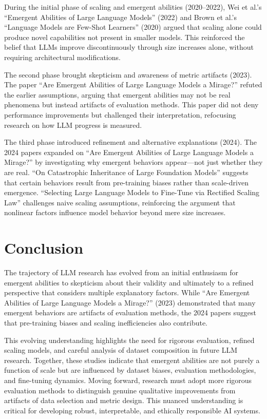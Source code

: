 \documentclass[10pt,a4paper]{article}
\begin{document}
During the initial phase of scaling and emergent abilities (2020–2022), Wei et al.'s ``Emergent Abilities of Large Language Models'' (2022) and Brown et al.'s ``Language Models are Few-Shot Learners'' (2020) argued that scaling alone could produce novel capabilities not present in smaller models. This reinforced the belief that LLMs improve discontinuously through size increases alone, without requiring architectural modifications.

The second phase brought skepticism and awareness of metric artifacts (2023). The paper ``Are Emergent Abilities of Large Language Models a Mirage?'' refuted the earlier assumptions, arguing that emergent abilities may not be real phenomena but instead artifacts of evaluation methods. This paper did not deny performance improvements but challenged their interpretation, refocusing research on how LLM progress is measured.

The third phase introduced refinement and alternative explanations (2024). The 2024 papers expanded on ``Are Emergent Abilities of Large Language Models a Mirage?'' by investigating why emergent behaviors appear—not just whether they are real. ``On Catastrophic Inheritance of Large Foundation Models'' suggests that certain behaviors result from pre-training biases rather than scale-driven emergence. ``Selecting Large Language Models to Fine-Tune via Rectified Scaling Law'' challenges naive scaling assumptions, reinforcing the argument that nonlinear factors influence model behavior beyond mere size increases.

\section{Conclusion}
The trajectory of LLM research has evolved from an initial enthusiasm for emergent abilities to skepticism about their validity and ultimately to a refined perspective that considers multiple explanatory factors. While ``Are Emergent Abilities of Large Language Models a Mirage?'' (2023) demonstrated that many emergent behaviors are artifacts of evaluation methods, the 2024 papers suggest that pre-training biases and scaling inefficiencies also contribute.

This evolving understanding highlights the need for rigorous evaluation, refined scaling models, and careful analysis of dataset composition in future LLM research. Together, these studies indicate that emergent abilities are not purely a function of scale but are influenced by dataset biases, evaluation methodologies, and fine-tuning dynamics. Moving forward, research must adopt more rigorous evaluation methods to distinguish genuine qualitative improvements from artifacts of data selection and metric design. This nuanced understanding is critical for developing robust, interpretable, and ethically responsible AI systems.



\end{document}
